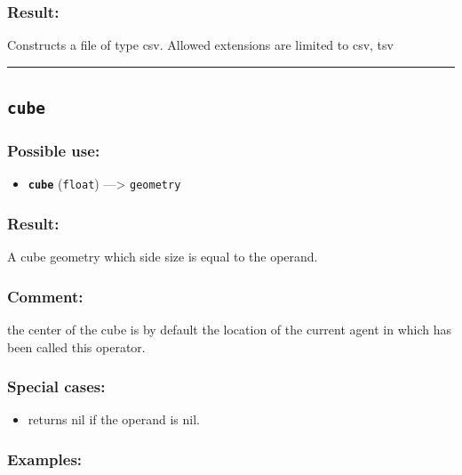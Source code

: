 \documentclass[]{book}
\providecommand{\tightlist}{%
  \setlength{\itemsep}{0pt}\setlength{\parskip}{0pt}}
\theoremstyle{definition}
\theoremstyle{definition}
\theoremstyle{definition}
\theoremstyle{remark}
\begin{document}
\subsubsection{Result:}\label{result-116}

Constructs a file of type csv. Allowed extensions are limited to csv,
tsv

\begin{center}\rule{0.5\linewidth}{\linethickness}\end{center}

\subsection{\texorpdfstring{\texttt{cube}}{cube}}\label{cube}

\subsubsection{Possible use:}\label{possible-use-121}

\begin{itemize}
\tightlist
\item
  \textbf{\texttt{cube}} (\texttt{float}) ---\textgreater{}
  \texttt{geometry}
\end{itemize}

\subsubsection{Result:}\label{result-117}

A cube geometry which side size is equal to the operand.

\subsubsection{Comment:}\label{comment-28}

the center of the cube is by default the location of the current agent
in which has been called this operator.

\subsubsection{Special cases:}\label{special-cases-46}

\begin{itemize}
\tightlist
\item
  returns nil if the operand is nil.
\end{itemize}

\subsubsection{Examples:}\label{examples-91}
\end{document}
